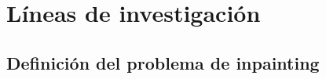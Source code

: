 \documentclass[assd_tpf_main.tex]{subfiles}
\begin{document}
\section{L\'ineas de investigaci\'on}

\subsection{Definici\'on del problema de inpainting}
\end{document}
